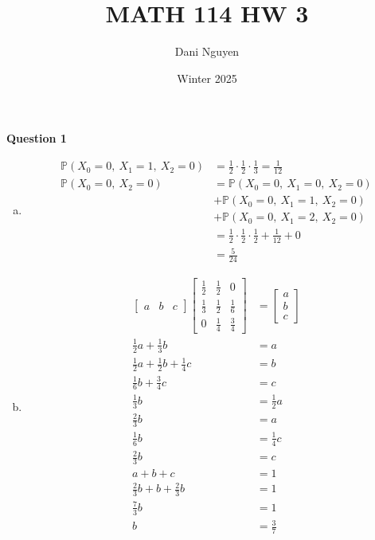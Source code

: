 \documentclass[12pt, letterpaper]{article}
\title{MATH 114 HW 3}
\author{Dani Nguyen}
\date{Winter 2025}
\begin{document}
\maketitle
\graphicspath{ {./} }

\noindent \textbf{Question 1}
\begin{enumerate}[a.]
    \item \begin{align*}
    \mathbb{P}(X_0 = 0,\ X_1 = 1,\ X_2 = 0) &= \frac 12 \cdot \frac 12 \cdot \frac 13 = \frac 1{12} \\
    \mathbb{P}(X_0 = 0,\ X_2 = 0) &= \mathbb{P}(X_0 = 0, \ X_1 = 0, \ X_2 = 0) \\
    &+ \mathbb{P}(X_0 = 0,\ X_1 = 1,\ X_2 = 0) \\
    &+ \mathbb{P}(X_0 = 0,\ X_1 = 2,\ X_2 = 0) \\
    &= \frac 12 \cdot \frac 12 \cdot \frac 12 + \frac 1{12} + 0 \\
    &= \frac 5{24}
    \end{align*}
    \item \begin{align*}
        \begin{bmatrix}
        a & b & c
    \end{bmatrix}
    \begin{bmatrix}
        \frac 12 & \frac 12 & 0 \\
        \frac 13 & \frac 12 & \frac 16 \\
        0 & \frac 14 & \frac 34
    \end{bmatrix} &= 
    \begin{bmatrix}
        a \\ b \\ c
    \end{bmatrix} \\
    \frac 12 a + \frac 13 b &= a \\
    \frac 12 a + \frac 12 b + \frac 14 c &= b \\
    \frac 16 b + \frac 34 c &= c \\
    \frac 13 b &= \frac 12 a \\
    \frac 23 b &= a \\
    \frac 16 b &= \frac 14 c \\
    \frac 23 b &= c \\
    a + b + c &= 1 \\
    \frac 23 b + b + \frac 23 b &= 1 \\
    \frac 73 b &= 1 \\
    b &= \frac 37 \\

\end{align*}
\end{enumerate}
\end{document}

